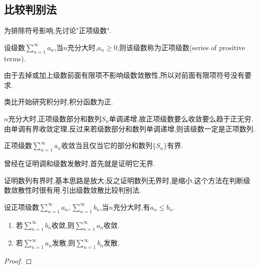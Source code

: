 \subsection{比较判别法}

为排除符号影响,先讨论"正项级数".

\begin{definition}[正项级数]
    设级数$\sum_{n=1}^\infty a_n$,当$n$充分大时,$a_n\geq 0$,则该级数称为正项级数(series of prositive terms).
\end{definition}

\begin{remark}
    由于去掉或加上级数前面有限项不影响级数敛散性,所以对前面有限项符号没有要求.
\end{remark}

\begin{note}
    类比开始研究积分时,积分函数为正.
\end{note}

$n$充分大时,正项级数部分和数列$S_n$单调递增,故正项级数要么收敛要么趋于正无穷.由单调有界收敛定理,反过来若级数部分和数列单调递增,则该级数一定是正项数列.

\begin{proposition}[正项级数收敛的充要条件]
    正项级数$\sum_{n=1}^\infty a_n$收敛当且仅当它的部分和数列$\{S_n\}$有界.
\end{proposition}

曾经在证明调和级数发散时,首先就是证明它无界.

\begin{example}%
    
\end{example}

证明数列有界时,基本思路是放大;反之证明数列无界时,是缩小.这个方法在判断级数敛散性时很有用.引出级数敛散比较判别法.

\begin{theorem}[比较判别法]
    设正项级数$\sum_{n=1}^\infty a_n,\sum_{n=1}^\infty b_n$,当$n$充分大时,有$a_n\leq b_n$.
    \begin{enumerate}
        \item 若$\sum_{n=1}^\infty b_n$收敛,则$\sum_{n=1}^\infty a_n$收敛.
        \item 若$\sum_{n=1}^\infty a_n$发散,则$\sum_{n=1}^\infty b_n$发散.
    \end{enumerate}
\end{theorem}

\begin{proof}%
    
\end{proof}

